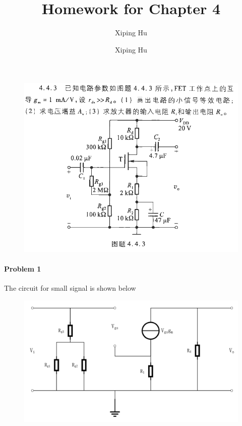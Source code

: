 \documentclass{article}
\author{Xiping Hu}
\author{Xiping Hu}
\affil{https://hxp.plus/}
\title{Homework for Chapter 4}
\begin{document}
\maketitle

\begin{figure}[H]
  \centering
  \includegraphics[width=\linewidth]{figures/Problem443}
  \label{fig:}
\end{figure}

\paragraph{Problem 1}

The circuit for small signal is shown below

\begin{figure}[H]
  \centering
  \includegraphics[width=\linewidth]{figures/Problem4431}
  \label{fig:}
\end{figure}
\end{document}

